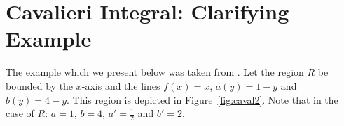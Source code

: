 \documentclass[twoside,reqno,11pt]{fcaa-var} %
\begin{document}
% 




\section{Cavalieri Integral: Clarifying Example}
\label{sec:cav_integral_example}
\noindent
The example which we present below was taken from \cite{ackermann12,grobler19}. Let the region $R$ be bounded by the $x$-axis and the lines $f(x)=x$, $a(y)=1-y$ and $b(y)=4-y$. This region is depicted in Figure~\ref{fig:caval2}. Note that in the case of $R$: $a=1$, $b=4$, $a'=\frac{1}{2}$ and $b'=2$.\\
\end{document}
